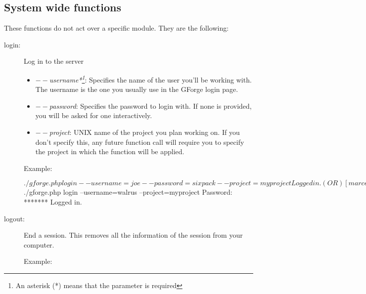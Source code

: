 \documentclass[a4]{article}
\newenvironment{functionlist}{
\begin{description}
}{
\end{description}
}
\newcommand{\function}[1]{\item[#1:] }
\newenvironment{parameterlist}{
\begin{itemize}
    }{
\end{itemize}
}
\newcommand{\parameter}[1]{\item \emph{#1}:}
\begin{document}
\subsection{System wide functions}
These functions do not act over a specific module. They are the following:
\begin{functionlist}
\function{login}
Log in to the server
\begin{parameterlist}
\parameter{$--$username*\footnote{An asterisk (*) means that the parameter is required}} Specifies the name of the
user you'll be working with. The username is the one you usually use in the GForge login page.
\parameter{$--$password} Specifies the password to login with. If none is provided, you will be asked for one
interactively.
\parameter{$--$project} UNIX name of the project you plan working on. If you don't specify this, any future function
call will require you to specify the project in which the function will be applied.
\end{parameterlist}

Example:
\begin{console}
$ ./gforge.php login --username=joe --password=sixpack --project=myproject
Logged in.

(OR)

[marcelo@linux gforge_cli]$ ./gforge.php login --username=walrus --project=myproject
Password: *******
Logged in.
\end{console}

\function{logout} End a session. This removes all the information of the session from your computer.

Example:
\end{functionlist}
\end{document}
